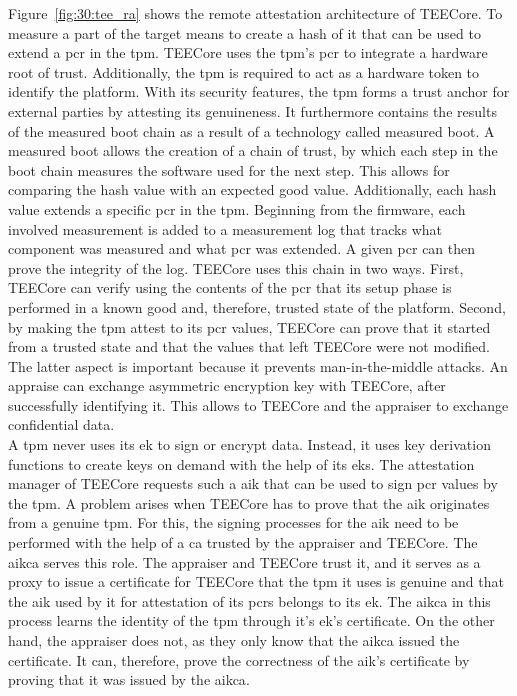 Figure~\ref{fig:30:tee_ra} shows the remote attestation architecture of TEECore.
To measure a part of the target means to create a hash of it that can be used to
extend a \gls{pcr} in the \gls{tpm}. TEECore uses the \gls{tpm}'s \gls{pcr} to
integrate a hardware root of trust. Additionally, the \gls{tpm} is required to
act as a hardware token to identify the platform. With its security features,
the \gls{tpm} forms a trust anchor for external parties by attesting its
genuineness. It furthermore contains the results of the measured boot chain as a
result of a technology called measured boot. A measured boot allows the creation
of a chain of trust, by which each step in the boot chain measures the software
used for the next step. This allows for comparing the hash value with an
expected good value. Additionally, each hash value extends a specific \gls{pcr}
in the \gls{tpm}. Beginning from the firmware, each involved measurement is
added to a measurement log that tracks what component was measured and what
\gls{pcr} was extended. A given \gls{pcr} can then prove the integrity of the
log. TEECore uses this chain in two ways. First, TEECore can verify using the
contents of the \gls{pcr} that its setup phase is performed in a known good and,
therefore, trusted state of the platform. Second, by making the \gls{tpm} attest
to its \gls{pcr} values, TEECore can prove that it started from a trusted state
and that the values that left TEECore were not modified. The latter aspect is
important because it prevents man-in-the-middle attacks. An appraise can
exchange asymmetric encryption key with TEECore, after successfully identifying
it. This allows to TEECore and the appraiser to exchange confidential data.\\

A \gls{tpm} never uses its \gls{ek} to sign or encrypt data. Instead, it uses
key derivation functions to create keys on demand with the help of its
\glspl{ek}. The attestation manager of TEECore requests such a \gls{aik} that
can be used to sign \gls{pcr} values by the \gls{tpm}. A problem arises when
TEECore has to prove that the \gls{aik} originates from a genuine \gls{tpm}. For
this, the signing processes for the \gls{aik} need to be performed with the help
of a \gls{ca} trusted by the appraiser and TEECore. The \gls{aikca} serves this
role. The appraiser and TEECore trust it, and it serves as a proxy to issue a
certificate for TEECore that the \gls{tpm} it uses is genuine and that the
\gls{aik} used by it for attestation of its \glspl{pcr} belongs to its \gls{ek}.
The \gls{aikca} in this process learns the identity of the \gls{tpm} through
it's \gls{ek}'s certificate. On the other hand, the appraiser does not, as they
only know that the \gls{aikca} issued the certificate. It can, therefore, prove
the correctness of the \gls{aik}'s certificate by proving that it was issued by
the \gls{aikca}.\\

